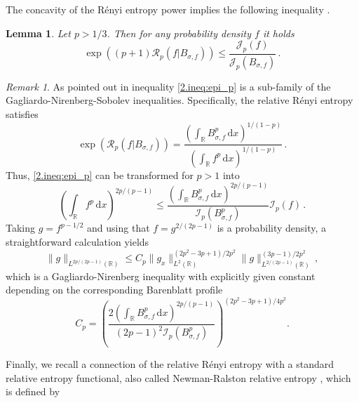 \documentclass[12pt]{amsart}
\newcommand{\R}{{\mathbb R}}
\newcommand{\renyi}{{\mathcal{R}}}
\newcommand{\dd}{{\mathrm{d}}}
\newcommand{\J}{\mathcal{J}}
\newcommand{\I}{\mathcal{I}}
\theoremstyle{plain}
\newtheorem{lemma}[theorem]{Lemma}
\theoremstyle{definition}
\theoremstyle{remark}
\newtheorem{remark}{Remark}[section]
\begin{document}
The concavity of the R\'enyi entropy power implies the following inequality \cite{CaTo14,SaTo14}.
\begin{lemma}\label{2.lem:epip}
    Let $p>1/3$. Then for any probability density $f$ it holds
    \begin{equation}\label{2.ineq:epi_p}
        \exp\left((p+1)\renyi_{p}(f|B_{\sigma,f})\right) \leq \frac{\J_p(f)}{\J_p(B_{\sigma,f})}\,.
    \end{equation}
\end{lemma}
\begin{remark}
    As pointed out in \cite{CaTo14, SaTo14} inequality \eqref{2.ineq:epi_p} is a sub-family of the Gagliardo-Nirenberg-Sobolev inequalities.
    Specifically, the relative R\'enyi entropy satisfies
    \begin{equation}\label{2.eq:expreny}
        \exp\left(\renyi_p(f|B_{\sigma,f})\right) = \frac{\left(\int_{\R}B_{\sigma,f}^p\,\dd x\right)^{1/(1-p)}}{\left(\int_{\R}f^p\,\dd x\right)^{1/(1-p)}}\,.
    \end{equation}
    Thus, \eqref{2.ineq:epi_p} can be transformed for $p>1$ into
    \begin{equation*}
        \left(\int_{\R}f^p\,\dd x\right)^{2p/(p-1)}\leq \frac{\left(\int_{\R}B_{\sigma,f}^p\,\dd x\right)^{2p/(p-1)}}{\I_p(B_{\sigma,f}^p)}\I_p(f)\,.
    \end{equation*}
    Taking $g = f^{p-1/2}$ and using that $f=g^{2/(2p-1)}$ is a probability density, a straightforward calculation yields
    \begin{equation*}
        \|g\|_{L^{2p/(2p-1)}(\R)}\leq C_p\|g_x\|_{L^2(\R)}^{(2p^2-3p+1)/2p^2}\|g\|_{L^{2/(2p-1)}(\R)}^{(3p-1)/2p^2}\,,
    \end{equation*}
    which is a Gagliardo-Nirenberg inequality with explicitly given constant depending on the corresponding Barenblatt profile
    \begin{equation*}
        C_p = \left(\frac{2\left(\int_{\R}B_{\sigma,f}^p\,\dd x\right)^{2p/(p-1)}}{(2p-1)^2\I_p(B_{\sigma,f}^p)}\right)^{(2p^2-3p+1)/4p^2}.
    \end{equation*}
\end{remark}
Finally, we recall a connection of the relative R\'enyi entropy with a standard relative entropy functional, also called Newman-Ralston relative entropy \cite{New84}, which is defined by
\end{document}
